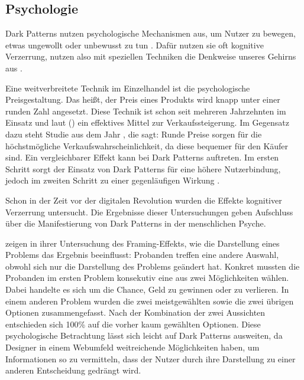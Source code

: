 \documentclass[conference,compsoc,final,a4paper]{IEEEtran}
\begin{document}
\subsection{Psychologie}
\label{chap:Psychologie}
Dark Patterns nutzen psychologische Mechanismen aus, um Nutzer zu bewegen, etwas ungewollt oder unbewusst zu tun \autocite{Brignull}. Dafür nutzen sie oft kognitive Verzerrung, nutzen also mit speziellen Techniken die Denkweise unseres Gehirns aus \autocite{Mathur2019}.

Eine weitverbreitete Technik im Einzelhandel ist die psychologische Preisgestaltung. Das heißt, der Preis eines Produkts wird knapp unter einer runden Zahl angesetzt. Diese Technik ist schon seit mehreren Jahrzehnten im Einsatz und laut \citeauthor{Bizer_2005} () \autocite{Bizer_2005} ein effektives Mittel zur Verkaufssteigerung. Im Gegensatz dazu steht \citeauthor{Wieseke_2015} \autocite{Wieseke_2015} Studie aus dem Jahr , die sagt: Runde Preise sorgen für die höchstmögliche Verkaufswahrscheinlichkeit, da diese bequemer für den Käufer sind. Ein vergleichbarer Effekt kann bei Dark Patterns auftreten. Im ersten Schritt sorgt der Einsatz von Dark Patterns für eine höhere Nutzerbindung, jedoch im zweiten Schritt zu einer gegenläufigen Wirkung \autocite{M.Bhoot2020}.

Schon in der Zeit vor der digitalen Revolution wurden die Effekte kognitiver Verzerrung untersucht. Die Ergebnisse dieser Untersuchungen geben Aufschluss über die Manifestierung von Dark Patterns in der menschlichen Psyche.

\citeauthor{Tversky453} \autocite{Tversky453} zeigen in ihrer Untersuchung des Framing-Effekts, wie die Darstellung eines Problems das Ergebnis beeinflusst: Probanden treffen eine andere Auswahl, obwohl sich nur die Darstellung des Problems geändert hat. Konkret mussten die Probanden im ersten Problem konsekutiv eine aus zwei Möglichkeiten wählen. Dabei handelte es sich um die Chance, Geld zu gewinnen oder zu verlieren. In einem anderen Problem wurden die zwei meistgewählten sowie die zwei übrigen Optionen zusammengefasst. Nach der Kombination der zwei Aussichten entschieden sich 100\% auf die vorher kaum gewählten Optionen. Diese psychologische Betrachtung lässt sich leicht auf Dark Patterns ausweiten, da Designer in einem Webumfeld weitreichende Möglichkeiten haben, um Informationen so zu vermitteln, dass der Nutzer durch ihre Darstellung zu einer anderen Entscheidung gedrängt wird.
\end{document}
